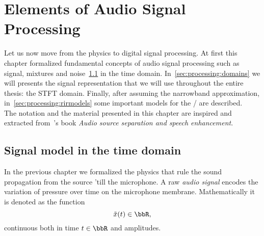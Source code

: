 \chapter{Elements of Audio Signal Processing}\label{ch:processing}
\vspace{-2.5em}
 Let us now move from the physics to digital signal processing.
At first this chapter formalized fundamental concepts of audio signal processing such as signal, mixtures and noise~\cref{sec:processing:model} in the time domain.
In~\cref{sec:processing:domains} we will presents the signal representation that we will use throughout the entire thesis: the STFT domain.
Finally, after assuming the narrowband approximation, in~\cref{sec:processing:rirmodels} some important models for the \RIR/ are described.
\\The notation and the material presented in this chapter are inspired and extracted from~\citeauthor{vincent2018audio}'s book \textit{Audio source separation and speech enhancement}.

\section{Signal model in the time domain}\label{sec:processing:model}
In the previous chapter we formalized the physics that rule the sound propagation from the source 'till the microphone.
A raw \textit{audio signal} encodes the variation of pressure over time on the microphone membrane.
Mathematically it is denoted as the function
\begin{equation}
    \contTime[\idxTime]{\mic} \in \R
    ,
\end{equation}
continuous both in time $t \in \R$ and amplitudes.

